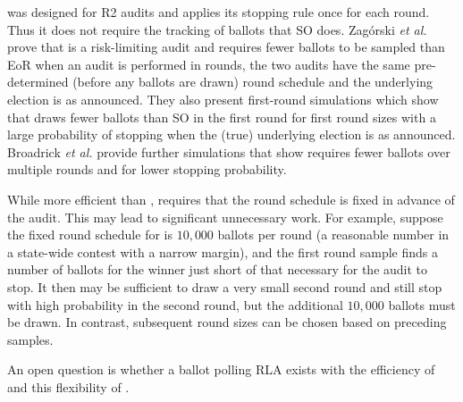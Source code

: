\Minerva was designed for R2 audits and applies its stopping rule once for each round. Thus it does not require the tracking of ballots that SO \BRAVO does. Zag{\'o}rski {\em et al.} \cite{usenix_minerva} prove that \Minerva is a risk-limiting audit and requires fewer ballots to be sampled than EoR \BRAVO when an audit is performed in rounds, the two audits have the same pre-determined (before any ballots are drawn) round schedule and the underlying election is as announced.
They also present first-round simulations which show that \Minerva draws fewer ballots than SO \BRAVO in the first round for first round sizes with a large probability of stopping when the (true) underlying election is as announced. 
Broadrick {\em et al.} provide further simulations that show \Minerva requires fewer ballots over multiple rounds and for lower stopping probability.

While more efficient than \BRAVO, \Minerva requires that the round schedule is fixed in advance of the audit. This may lead to significant unnecessary work. For example, suppose the fixed round schedule for \Minerva is $10,000$ ballots per round (a reasonable number in a state-wide contest with a narrow margin), and the first round sample finds a number of ballots for the winner just short of that necessary for the audit to stop. It then may be sufficient to draw a very small second round and still stop with high probability in the second round, but the additional $10,000$ ballots must be drawn. In contrast, subsequent \BRAVO round sizes can be chosen based on preceding samples.

An open question is whether a ballot polling RLA exists with the efficiency of \Minerva and this flexibility of \BRAVO.

